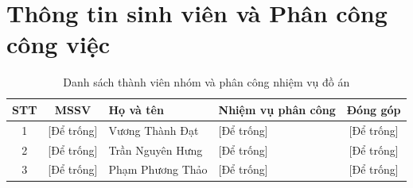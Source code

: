 \vspace{0.4cm}
\section*{Thông tin sinh viên và Phân công công việc}

\begin{table}[h!]
    \centering
    \caption{Danh sách thành viên nhóm và phân công nhiệm vụ đồ án}
    \label{tab:thong_tin_sinh_vien}
    \vspace{0.15cm}
    \renewcommand{\arraystretch}{1.3} 
    \small
    \begin{tabularx}{\textwidth}{|c|c|l|X|c|}
        \hline
        \textbf{STT} & \textbf{MSSV} & \textbf{Họ và tên} & \textbf{Nhiệm vụ phân công} & \textbf{Đóng góp} \\
        \hline
        1 & [Để trống] & Vương Thành Đạt & [Để trống] & [Để trống] \\
        \hline
        2 & [Để trống] & Trần Nguyên Hưng & [Để trống] & [Để trống] \\
        \hline
        3 & [Để trống] & Phạm Phương Thảo & [Để trống] & [Để trống] \\
        \hline
    \end{tabularx}
\end{table}
